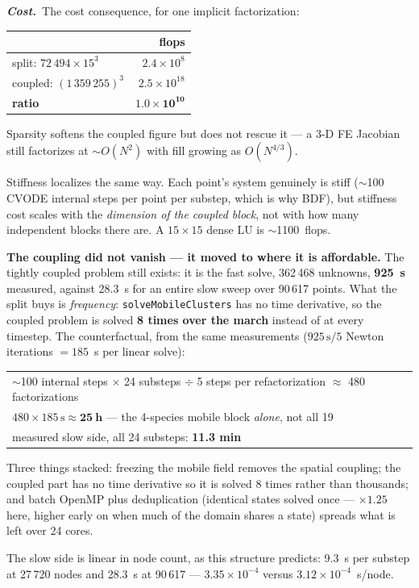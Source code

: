 \documentclass[11pt,a4paper]{article}
\newcommand{\code}[1]{\texttt{\small #1}}
\newcommand{\cost}[1]{\par\noindent\textbf{\itshape Cost.}\ #1\par}
\begin{document}
\cost{The cost consequence, for one implicit factorization:

\begin{center}
\begin{tabular}{lr}
\toprule
 & flops \\
\midrule
split: $72\,494 \times 15^3$ & $2.4\times10^{8}$ \\
coupled: $(1\,359\,255)^3$   & $2.5\times10^{18}$ \\
\midrule
\textbf{ratio} & $\mathbf{1.0\times10^{10}}$ \\
\bottomrule
\end{tabular}
\end{center}

\noindent
Sparsity softens the coupled figure but does not rescue it --- a 3-D FE
Jacobian still factorizes at $\sim O(N^2)$ with fill growing as $O(N^{4/3})$.

Stiffness localizes the same way. Each point's system genuinely is stiff
($\sim$100 CVODE internal steps per point per substep, which is why BDF), but
stiffness cost scales with the \emph{dimension of the coupled block}, not with
how many independent blocks there are. A $15\times15$ dense LU is
$\sim$1100~flops.

\textbf{The coupling did not vanish --- it moved to where it is affordable.}
The tightly coupled problem still exists: it is the fast solve, 362\,468
unknowns, \textbf{925~s} measured, against 28.3~s for an entire slow sweep over
90\,617 points. What the split buys is \emph{frequency}:
\code{solveMobileClusters} has no time derivative, so the coupled problem is
solved \textbf{8 times over the march} instead of at every timestep. The
counterfactual, from the same measurements ($925\,\text{s}/5$ Newton
iterations $= 185$~s per linear solve):

\begin{center}\small
\begin{tabular}{l}
$\sim$100 internal steps $\times$ 24 substeps $\div$ 5 steps per refactorization $\approx$ 480 factorizations \\
$480 \times 185\,\text{s} \approx \mathbf{25\ h}$ \quad --- the 4-species mobile block \emph{alone}, not all 19 \\
measured slow side, all 24 substeps: \quad\quad \textbf{11.3 min} \\
\end{tabular}
\end{center}

\noindent
Three things stacked: freezing the mobile field removes the spatial coupling;
the coupled part has no time derivative so it is solved 8 times rather than
thousands; and batch OpenMP plus deduplication (identical states solved once
--- $\times1.25$ here, higher early on when much of the domain shares a state)
spreads what is left over 24 cores.

The slow side is linear in node count, as this structure predicts: 9.3~s per
substep at 27\,720 nodes and 28.3~s at 90\,617 --- $3.35\times10^{-4}$ versus
$3.12\times10^{-4}$~s/node.}
\end{document}
